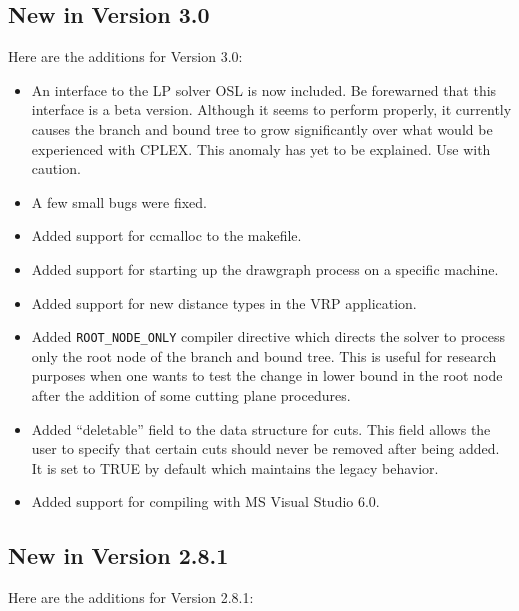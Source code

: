 \subsection{New in Version 3.0}

Here are the additions for Version 3.0:

\begin{itemize}

\item An interface to the LP solver OSL is now included. Be forewarned
that this interface is a beta version. Although it seems to perform
properly, it currently causes the branch and bound tree to grow
significantly over what would be experienced with CPLEX. This anomaly
has yet to be explained. Use with caution. 

\item A few small bugs were fixed.

\item Added support for ccmalloc to the makefile.

\item Added support for starting up the drawgraph process on a specific
machine. 

\item Added support for new distance types in the VRP application.

\item Added {\tt ROOT\_NODE\_ONLY} compiler directive which directs
the solver to process only the root node of the branch and bound tree.
This is useful for research purposes when one wants to test the change
in lower bound in the root node after the addition of some cutting
plane procedures.

\item Added ``deletable'' field to the data structure for cuts. This field
allows the user to specify that certain cuts should never be removed
after being added. It is set to TRUE by default which maintains the
legacy behavior.

\item Added support for compiling with MS Visual Studio 6.0.

\end{itemize}

\subsection{New in Version 2.8.1}

Here are the additions for Version 2.8.1:

